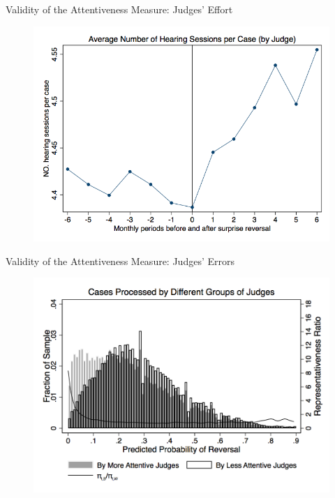 \begin{frame}{Validity of the Attentiveness Measure: Judges' Effort}
    \begin{figure}
        \centering
        \includegraphics[height = 0.7 \textheight]{images/hearing_num.png}
    \end{figure}
\end{frame}

\begin{frame}{Validity of the Attentiveness Measure: Judges' Errors}
    \begin{figure}
        \centering
        \includegraphics[height = 0.7 \textheight]{images/dist.png}
    \end{figure}
\end{frame}

